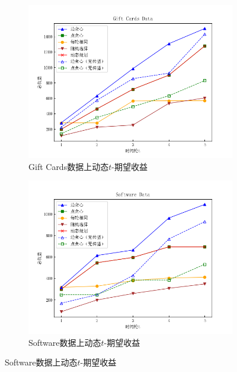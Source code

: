 \begin{figure}[th]
    \centering
    \begin{subfigure}{0.45\textwidth}
        \includegraphics[width=\linewidth]{figure/sasim/adp/adp_cn_gift}
        \caption{Gift Cards数据上动态$t$-期望收益}
        \label{fig:adp1}
    \end{subfigure}
    \hfill
    \begin{subfigure}{0.45\textwidth}
        \includegraphics[width=\linewidth]{figure/sasim/adp/adp_cn_software}
        \caption{Software数据上动态$t$-期望收益}
        \label{fig:adp2}
    \end{subfigure}

    \medskip


\end{figure}
